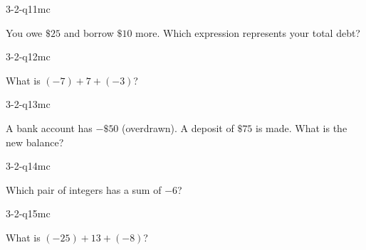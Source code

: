 \begin{practiceQuestion}{3-2-q11}{mc}
\begin{questionText}
You owe $\$25$ and borrow $\$10$ more. Which expression represents your total debt?
\end{questionText}
\end{practiceQuestion}

\begin{practiceQuestion}{3-2-q12}{mc}
\begin{questionText}
What is $(-7) + 7 + (-3)$?
\end{questionText}
\end{practiceQuestion}

\begin{practiceQuestion}{3-2-q13}{mc}
\begin{questionText}
A bank account has $-\$50$ (overdrawn). A deposit of $\$75$ is made. What is the new balance?
\end{questionText}
\end{practiceQuestion}

\begin{practiceQuestion}{3-2-q14}{mc}
\begin{questionText}
Which pair of integers has a sum of $-6$?
\end{questionText}
\end{practiceQuestion}

\begin{practiceQuestion}{3-2-q15}{mc}
\begin{questionText}
What is $(-25) + 13 + (-8)$?
\end{questionText}
\end{practiceQuestion}

